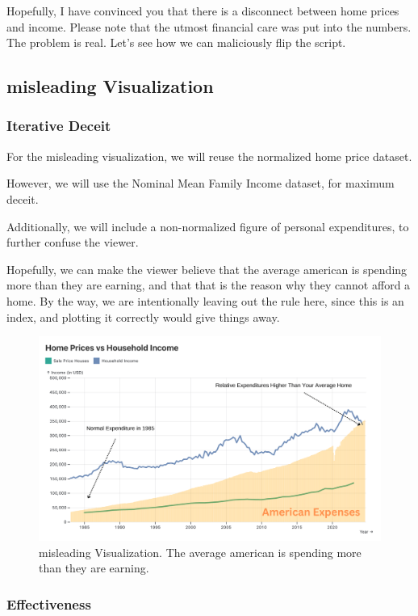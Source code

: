\documentclass{article}
\begin{document}
Hopefully, I have convinced you that there is a disconnect between home prices and income. 
Please note that the utmost financial care was put into the numbers. The problem is real. 
Let's see how we can maliciously flip the script.

\newpage

\subsection{misleading Visualization}
\subsubsection{Iterative Deceit}

For the misleading visualization, we will reuse the normalized home price dataset.

However, we will use the Nominal Mean Family Income dataset, for maximum deceit.

Additionally, we will include a non-normalized figure of personal expenditures, to further confuse the viewer.

Hopefully, we can make the viewer believe that the average american is spending more than they are earning,
and that that is the reason why they cannot afford a home. By the way, we are intentionally leaving out the rule here,
since this is an index, and plotting it correctly would give things away.

\begin{figure}[ht] 
  \centering
  \includegraphics[width=.75\textwidth]{figs/missleading.png}
  \caption{
      misleading Visualization. The average american is spending more than they are earning.
  }
  \label{fig:misleading}
\end{figure}
\subsubsection{Effectiveness}
\end{document}
